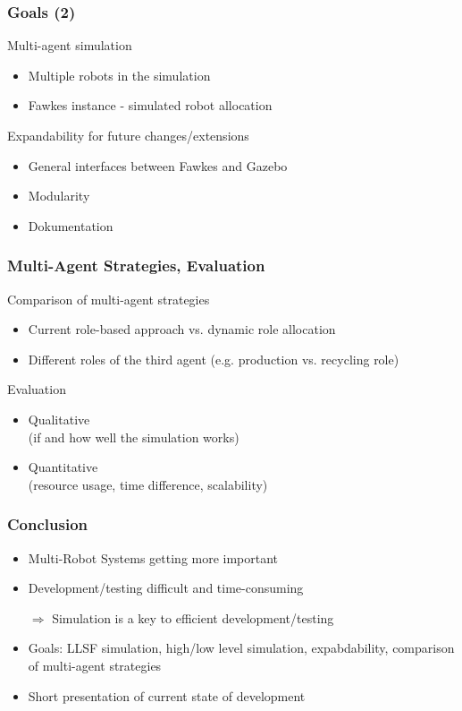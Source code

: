 \documentclass[]{beamer}
\begin{document}
\begin{frame}
\frametitle{Goals (2)}
Multi-agent simulation
\begin{itemize}
\item Multiple robots in the simulation
\item Fawkes instance - simulated robot allocation
\end{itemize}
\pause
Expandability for future changes/extensions
\begin{itemize}
\item General interfaces between Fawkes and Gazebo
\item Modularity
\item Dokumentation
\end{itemize}
\end{frame}

\begin{frame}
\frametitle{Multi-Agent Strategies, Evaluation}
Comparison of multi-agent strategies
\begin{itemize}
\item Current role-based approach vs. dynamic role allocation
\item Different roles of the third agent (e.g. production vs. recycling role)
\end{itemize}
\pause
Evaluation
\begin{itemize}
\item Qualitative\\(if and how well the simulation works)
\item Quantitative\\(resource usage, time difference, scalability)
\end{itemize}
\end{frame}

\begin{frame}
\frametitle{Conclusion}
\begin{itemize}
\item Multi-Robot Systems getting more important
\item Development/testing difficult and time-consuming
\item[$\Rightarrow$] Simulation is a key to efficient development/testing
\pause
\item Goals: LLSF simulation, high/low level simulation, expabdability, comparison of multi-agent strategies
\pause
\item Short presentation of current state of development
\end{itemize}
\end{frame}
\end{document}
